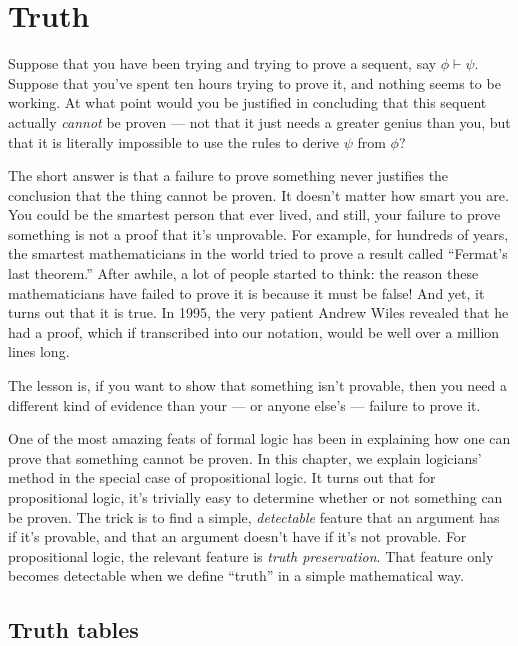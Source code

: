 \chapter{Truth} \label{truth}

Suppose that you have been trying and trying to prove a sequent, say
$\phi\vdash\psi$.  Suppose that you've spent ten hours trying to prove
it, and nothing seems to be working.  At what point would you be
justified in concluding that this sequent actually {\it cannot} be
proven --- not that it just needs a greater genius than you, but that
it is literally impossible to use the rules to derive $\psi$ from
$\phi$?

The short answer is that a failure to prove something never justifies
the conclusion that the thing cannot be proven.  It doesn't matter how
smart you are.  You could be the smartest person that ever lived, and
still, your failure to prove something is not a proof that it's
unprovable.  For example, for hundreds of years, the smartest
mathematicians in the world tried to prove a result called ``Fermat's
last theorem.''  After awhile, a lot of people started to think: the
reason these mathematicians have failed to prove it is because it must
be false!  And yet, it turns out that it is true.  In 1995, the very
patient Andrew Wiles revealed that he had a proof, which if
transcribed into our notation, would be well over a million lines
long.

The lesson is, if you want to show that something isn't provable, then
you need a different kind of evidence than your --- or anyone else's
--- failure to prove it.

One of the most amazing feats of formal logic has been in explaining
how one can prove that something cannot be proven.  In this chapter,
we explain logicians' method in the special case of propositional
logic.  It turns out that for propositional logic, it's trivially easy
to determine whether or not something can be proven.  The trick is to
find a simple, {\it detectable} feature that an argument has if it's
provable, and that an argument doesn't have if it's not provable.  For
propositional logic, the relevant feature is \emph{truth
  preservation}.  That feature only becomes detectable when we define
``truth'' in a simple mathematical way.

\section{Truth tables}

